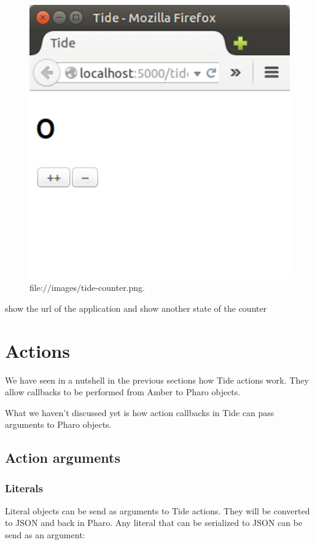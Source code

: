 \documentclass[a4paper,10pt,twoside]{book}
\begin{document}
\begin{figure}

\begin{center}
\includegraphics[width=1.0\textwidth]{images/tide-counter.png}\caption{file:$/$$/$images$/$tide-counter.png.\label{images/tide-counter.png}}\end{center}
\end{figure}


\begin{todo}

show the url of the application and show another state of the counter
\end{todo}
\chapter{ Actions}
We have seen in a nutshell in the previous sections how Tide actions work. They allow callbacks
to be performed from Amber to Pharo objects.

What we haven't discussed yet is how action callbacks in Tide can pass arguments to Pharo objects.
\section{ Action arguments}\subsection{ Literals}
Literal objects can be send as arguments to Tide actions. They will be converted to JSON and back in
Pharo. Any literal that can be serialized to JSON can be send as an argument:
\end{document}
